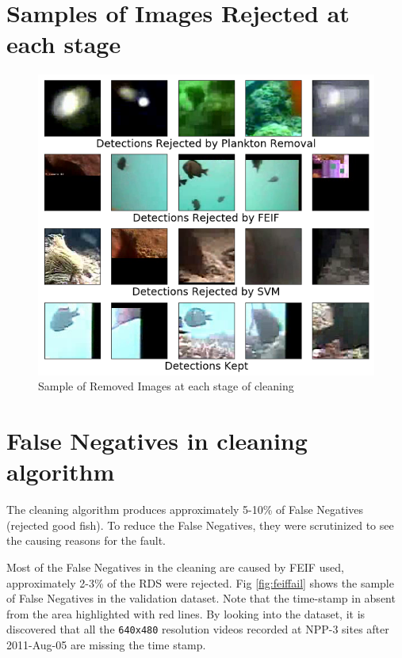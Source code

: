 \documentclass[bsc,logo,twoside,fullspacing,parskip]{infthesis}
\begin{document}
\section{Samples of Images Rejected at each stage}

\begin{figure}[h]
    \centering
    \includegraphics[scale=0.45]{graph/finalsample.png}
    \caption{Sample of Removed Images at each stage of cleaning}
    \label{fig:samplestage}
\end{figure}

\section{False Negatives in cleaning algorithm}
\label{sec:falsenegative}
\label{sec:feiffault}
\label{sec:svmfault}

The cleaning algorithm produces approximately 5-10\% of False Negatives (rejected good fish). 
To reduce the False Negatives, they were scrutinized to see the causing reasons for the fault.

Most of the False Negatives in the cleaning are caused by FEIF used, approximately 2-3\% of the RDS were rejected. 
Fig \ref{fig:feiffail} shows the sample of False Negatives in the validation dataset.
Note that the time-stamp in absent from the area highlighted with red lines.
By looking into the dataset, it is discovered that all the {\tt 640x480} resolution videos recorded at NPP-3 sites after 2011-Aug-05 are missing the time stamp.
\end{document}
